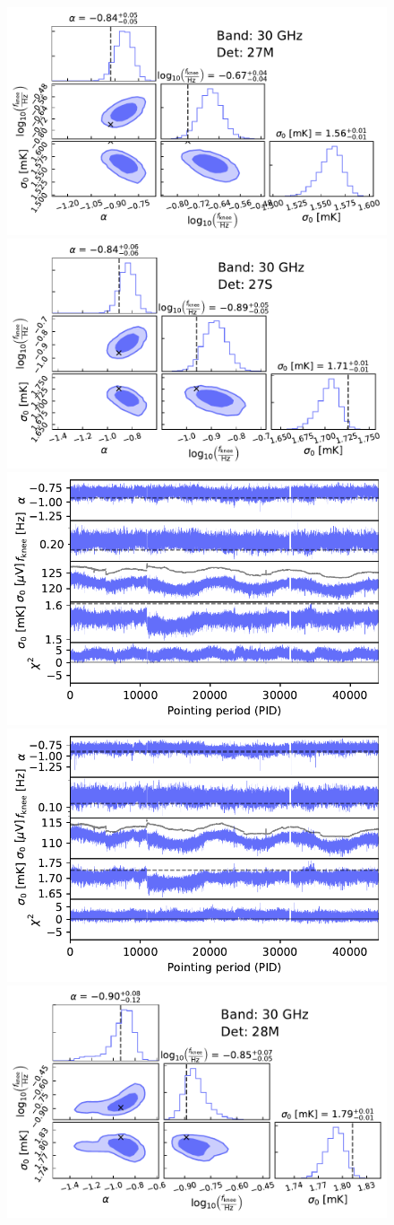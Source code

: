 \documentclass[twocolumn]{aa}
\begin{document}
\begin{figure}[p]
  \begin{center}
    \includegraphics[width=0.495\linewidth]{figs/corner_band_030_det_1_mean.pdf}
    \includegraphics[width=0.495\linewidth]{figs/corner_band_030_det_2_mean.pdf}\\
    \includegraphics[width=0.495\linewidth]{figs/xi_vs_pid_band_030_det_1_mean.pdf}
    \includegraphics[width=0.495\linewidth]{figs/xi_vs_pid_band_030_det_2_mean.pdf}\\
    \vspace*{1mm}
    \includegraphics[width=0.495\linewidth]{figs/corner_band_030_det_3_mean.pdf}

\end{center}
\end{figure}
\end{document}
